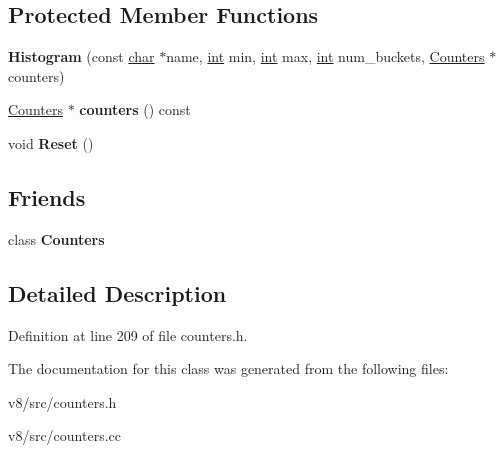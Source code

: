 \subsection*{Protected Member Functions}
\begin{DoxyCompactItemize}
\item 
\mbox{\label{classv8_1_1internal_1_1Histogram_a8d2d4e7af0769370ce50ac93eafb43d7}} 
{\bfseries Histogram} (const \mbox{\hyperlink{classchar}{char}} $\ast$name, \mbox{\hyperlink{classint}{int}} min, \mbox{\hyperlink{classint}{int}} max, \mbox{\hyperlink{classint}{int}} num\+\_\+buckets, \mbox{\hyperlink{classv8_1_1internal_1_1Counters}{Counters}} $\ast$counters)
\item 
\mbox{\label{classv8_1_1internal_1_1Histogram_ab6164bb073f2a9becba7461b150ba4b5}} 
\mbox{\hyperlink{classv8_1_1internal_1_1Counters}{Counters}} $\ast$ {\bfseries counters} () const
\item 
\mbox{\label{classv8_1_1internal_1_1Histogram_a74a1b1e9c261914088b73e0b36bbb737}} 
void {\bfseries Reset} ()
\end{DoxyCompactItemize}
\subsection*{Friends}
\begin{DoxyCompactItemize}
\item 
\mbox{\label{classv8_1_1internal_1_1Histogram_a5545327f141103b96b160ddc48274bc0}} 
class {\bfseries Counters}
\end{DoxyCompactItemize}


\subsection{Detailed Description}


Definition at line 209 of file counters.\+h.



The documentation for this class was generated from the following files\+:\begin{DoxyCompactItemize}
\item 
v8/src/counters.\+h\item 
v8/src/counters.\+cc\end{DoxyCompactItemize}
